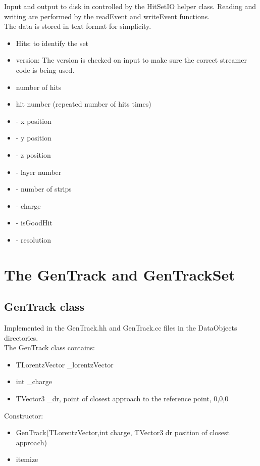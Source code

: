 \documentclass[aps,prd,superscriptaddress,floatfix]{revtex4}
\begin{document}
Input and output to disk in controlled by the HitSetIO helper class.  Reading and writing
are performed by the readEvent and writeEvent functions.
\\

The data is stored in text format for simplicity.

\begin{itemize}
\item  Hits: to identify the set
\item version: The version is checked on input to make sure the correct streamer code is being used.
\item number of hits
\item hit number (repeated number of hits times)
\item - x position
\item - y position
\item - z position
\item - layer number
\item - number of strips
\item - charge
\item - isGoodHit
\item - resolution
\end{itemize}

\section{The GenTrack and GenTrackSet}
\subsection{GenTrack class}
Implemented in the GenTrack.hh and GenTrack.cc files in the DataObjects directories.
\\

The GenTrack class contains:
\begin{itemize}
\item TLorentzVector \_lorentzVector
\item int \_charge
\item TVector3 \_dr, point of closest approach to the reference point, 0,0,0
\end{itemize}

Constructor:

\begin{itemize}
\item GenTrack(TLorentzVector,int charge, TVector3 dr position of closest approach)
\item{itemize}
\end{itemize}
\end{document}
